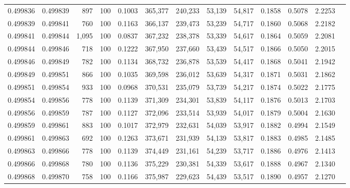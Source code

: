 \begin{tabular}{rrrrrrrrrrrrr}
0.499836 & 0.499839 &   897 & 100 &                                     0.1003 & 365,377 & 240,233 &  53,139 &  54,817 & 0.1858 & 0.5078 & 2.2253 \\
0.499839 & 0.499841 &   760 & 100 &                                     0.1163 & 366,137 & 239,473 &  53,239 &  54,717 & 0.1860 & 0.5068 & 2.2182 \\
0.499841 & 0.499844 & 1,095 & 100 &                                     0.0837 & 367,232 & 238,378 &  53,339 &  54,617 & 0.1864 & 0.5059 & 2.2081 \\
0.499844 & 0.499846 &   718 & 100 &                                     0.1222 & 367,950 & 237,660 &  53,439 &  54,517 & 0.1866 & 0.5050 & 2.2015 \\
0.499846 & 0.499849 &   782 & 100 &                                     0.1134 & 368,732 & 236,878 &  53,539 &  54,417 & 0.1868 & 0.5041 & 2.1942 \\
0.499849 & 0.499851 &   866 & 100 &                                     0.1035 & 369,598 & 236,012 &  53,639 &  54,317 & 0.1871 & 0.5031 & 2.1862 \\
0.499851 & 0.499854 &   933 & 100 &                                     0.0968 & 370,531 & 235,079 &  53,739 &  54,217 & 0.1874 & 0.5022 & 2.1775 \\
0.499854 & 0.499856 &   778 & 100 &                                     0.1139 & 371,309 & 234,301 &  53,839 &  54,117 & 0.1876 & 0.5013 & 2.1703 \\
0.499856 & 0.499859 &   787 & 100 &                                     0.1127 & 372,096 & 233,514 &  53,939 &  54,017 & 0.1879 & 0.5004 & 2.1630 \\
0.499859 & 0.499861 &   883 & 100 &                                     0.1017 & 372,979 & 232,631 &  54,039 &  53,917 & 0.1882 & 0.4994 & 2.1549 \\
0.499861 & 0.499863 &   692 & 100 &                                     0.1263 & 373,671 & 231,939 &  54,139 &  53,817 & 0.1883 & 0.4985 & 2.1485 \\
0.499863 & 0.499866 &   778 & 100 &                                     0.1139 & 374,449 & 231,161 &  54,239 &  53,717 & 0.1886 & 0.4976 & 2.1413 \\
0.499866 & 0.499868 &   780 & 100 &                                     0.1136 & 375,229 & 230,381 &  54,339 &  53,617 & 0.1888 & 0.4967 & 2.1340 \\
0.499868 & 0.499870 &   758 & 100 &                                     0.1166 & 375,987 & 229,623 &  54,439 &  53,517 & 0.1890 & 0.4957 & 2.1270 \\

\end{tabular}
